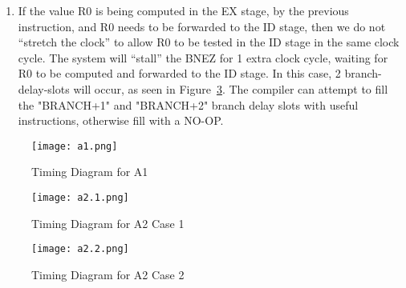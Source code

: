 \begin{enumerate}[wide, label=(A\arabic*)]
\begin{enumerate}[wide, label=\arabic*.]
\item If the value R0 is being computed in the EX stage, by the previous instruction, and R0 needs to be forwarded to the ID stage, then we do not “stretch the clock” to allow R0 to be tested in the ID stage in the same clock cycle. The system will “stall” the BNEZ for 1 extra clock cycle, waiting for R0 to be computed and forwarded to the ID stage. In this case, 2 branch-delay-slots will occur, as seen in Figure~\ref{fig:A2.2}. The compiler can attempt to fill the "BRANCH+1" and "BRANCH+2" branch delay slots with useful instructions, otherwise fill with a NO-OP.
\end{enumerate}
\end{enumerate}

\begin{figure}[htp]
    \centering
    \texttt{[image: a1.png]}
    \caption{\label{fig:A1}Timing Diagram for A1}
\end{figure}

\begin{figure}[htp]
    \centering
    \texttt{[image: a2.1.png]}
    \caption{\label{fig:A2.1}Timing Diagram for A2 Case 1}
\end{figure}

\begin{figure}[htp]
    \centering
    \texttt{[image: a2.2.png]}
    \caption{\label{fig:A2.2}Timing Diagram for A2 Case 2}
\end{figure}
